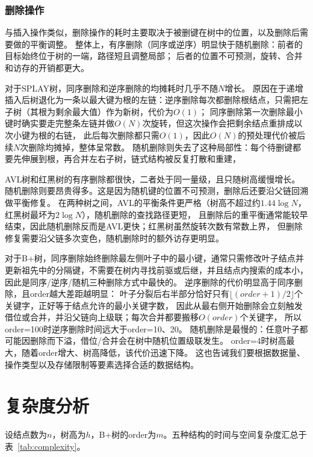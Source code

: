 \documentclass[openany]{book}
\begin{document}
\subsection{删除操作}

与插入操作类似，删除操作的耗时主要取决于被删键在树中的位置，以及删除后需要做的平衡调整。
整体上，有序删除（同序或逆序）明显快于随机删除：前者的目标始终位于树的一端，路径短且调整局部；
后者的位置不可预测，旋转、合并和访存的开销都更大。

对于SPLAY树，同序删除和逆序删除的均摊耗时几乎不随$N$增长。
原因在于递增插入后树退化为一条以最大键为根的左链：逆序删除每次都删除根结点，只需把左子树（其根为剩余最大值）作为新树，代价为$O(1)$；
同序删除第一次删除最小键时确实要走完整条左链并做$O(N)$次旋转，但这次操作会把剩余结点重排成以次小键为根的右链，
此后每次删除都只需$O(1)$，因此$O(N)$的预处理代价被后续$N$次删除均摊掉，整体呈常数。
随机删除则失去了这种局部性：每个待删键都要先伸展到根，再合并左右子树，链式结构被反复打散和重建，

AVL树和红黑树的有序删除都很快，二者处于同一量级，且只随树高缓慢增长。
随机删除则要昂贵得多。这是因为随机键的位置不可预测，删除后还要沿父链回溯做平衡修复。
在两种树之间，AVL的平衡条件更严格（树高不超过约$1.44\log N$，红黑树最坏为$2\log N$），随机删除的查找路径更短，
且删除后的重平衡通常能较早结束，因此随机删除反而是AVL更快；红黑树虽然旋转次数有常数上界，
但删除修复需要沿父链多次变色，随机删除时的额外访存更明显。

对于B+树，同序删除始终删除最左侧叶子中的最小键，通常只需修改叶子结点并更新祖先中的分隔键，不需要在树内寻找前驱或后继，并且结点内搜索的成本小，
因此是同序/逆序/随机三种删除方式中最快的。
逆序删除的代价明显高于同序删除，且order越大差距越明显：
叶子分裂后右半部分恰好只有$\lfloor (order+1)/2\rfloor$个关键字，正好等于结点允许的最小关键字数，
因此从最右侧开始删除会立刻触发借位或合并，并沿父链向上级联；每次合并都要搬移$O(order)$个关键字，
所以order=100时逆序删除时间远大于order=10、20。
随机删除是最慢的：任意叶子都可能因删除而下溢，借位/合并会在树中随机位置级联发生。
order=4时树高最大，随着order增大、树高降低，该代价迅速下降。
这也告诫我们要根据数据量、操作类型以及存储限制等要素选择合适的数据结构。

\chapter{复杂度分析}
设结点数为$n$，树高为$h$，B+树的order为$m$。五种结构的时间与空间复杂度汇总于表~\ref{tab:complexity}。
\end{document}
